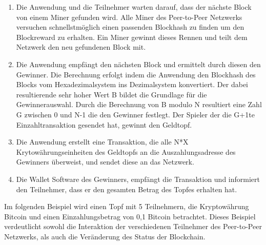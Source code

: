 \begin{enumerate}
\item Die Anwendung und die Teilnehmer warten darauf, dass der nächste Block von einem Miner gefunden wird. Alle Miner des Peer-to-Peer Netzwerks versuchen schnellstmöglich einen passenden Blockhash zu finden um den Blockreward zu erhalten. Ein Miner gewinnt dieses Rennen und teilt dem Netzwerk den neu gefundenen Block mit.
\item Die Anwendung empfängt den nächsten Block und ermittelt durch diesen den Gewinner. Die Berechnung erfolgt indem die Anwendung den Blockhash des Blocks vom Hexadezimalsystem ins Dezimalsystem konvertiert. Der dabei resultierende sehr hoher Wert B bildet die Grundlage für die Gewinnerauswahl. Durch die Berechnung von B modulo N resultiert eine Zahl G zwischen 0 und N-1 die den Gewinner festlegt. Der Spieler der die G+1te Einzahltransaktion gesendet hat, gewinnt den Geldtopf.
\item Die Anwendung erstellt eine Transaktion, die alle N*X Krytowährungseinheiten des Geldtopfs an die Auszahlungsadresse des Gewinners überweist, und sendet diese an das Netzwerk.
\item Die Wallet Software des Gewinners, empfängt die Transaktion und informiert den Teilnehmer, dass er den gesamten Betrag des Topfes erhalten hat.
\end{enumerate}

\vspace{1cm}
Im folgenden Beispiel wird einen Topf mit 5 Teilnehmern, die Kryptowährung Bitcoin und einen Einzahlungsbetrag von 0,1 Bitcoin betrachtet. Dieses Beispiel verdeutlicht sowohl die Interaktion der verschiedenen Teilnehmer des Peer-to-Peer Netzwerks, als auch die Veränderung des Status der Blockchain.

